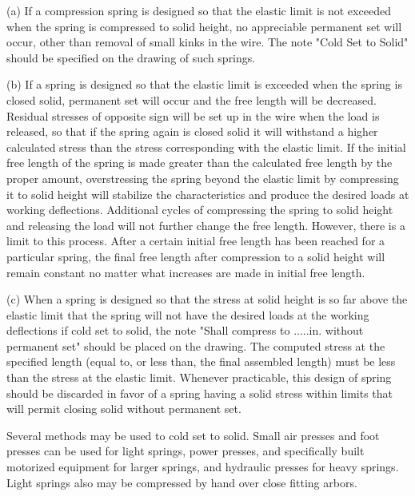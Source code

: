 \documentclass[10pt]{article}
\begin{document}
(a) If a compression spring is designed so that the elastic limit is not exceeded when the spring is compressed to solid height, no appreciable permanent set will occur, other than removal of small kinks in the wire. 
The note "Cold Set to Solid" should be specified on the drawing of such springs.

(b) If a spring is designed so that the elastic limit is exceeded when the spring is closed solid, permanent set will occur and the free length will be decreased.
Residual stresses of opposite sign will be set up in the wire when the load is released, so that if the spring again is closed solid it will withstand a higher calculated stress than the stress corresponding with the elastic limit.
If the initial free length of the spring is made greater than the calculated free length by the proper amount, overstressing the spring beyond the elastic limit by compressing it to solid height will stabilize the characteristics and produce the desired loads at working deflections. 
Additional cycles of compressing the spring to solid height and releasing the load will not further change the free length. 
However, there is a limit to this process. 
After a certain initial free length has been reached for a particular spring, the final free length after compression to a solid height will remain constant no matter what increases are made in initial free length.

(c) When a spring is designed so that the stress at solid height is so far above the elastic limit that the spring will not have the desired loads at the working deflections if cold
set to solid, the note "Shall compress to .....in. without permanent set" should be placed on the drawing. 
The computed stress at the specified length (equal to, or less than, the final assembled length) must be less than the stress at the elastic limit. 
Whenever practicable, this design of spring should be discarded in favor of a spring having a solid stress within limits that will permit closing solid without permanent set.

Several methods may be used to cold set to solid. 
Small air presses and foot presses can be used for light springs, power presses, and specifically built motorized equipment for larger springs, and hydraulic presses for
heavy springs. 
Light springs also may be compressed by hand over close fitting arbors.
\end{document}
